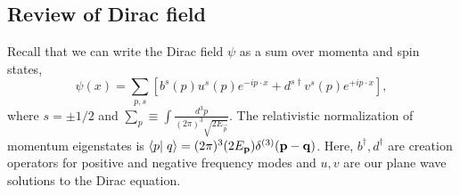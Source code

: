 \subsection*{Review of Dirac field} Recall that we can write the Dirac field $\psi$ as a sum over momenta and spin states,
\begin{equation}
    \psi(x)=\sum_{p,s}\left[ b^s(p) u^s(p) e^{-ip\cdot x}+d^{s\dagger}v^s(p) e^{+ip\cdot x}\right],
\end{equation}
where $s=\pm 1/2$ and $\sum_p\equiv \int \frac{d^3p}{(2\pi)^3 \sqrt{2E_{\vec p}}}$. The relativistic normalization of momentum eigenstates is $\braket{p}{q}=(2\pi)^3 (2E_{\vec p})\delta^{(3)}(\vec p - \vec q)$. Here, $b^\dagger,d^\dagger$ are creation operators for positive and negative frequency modes and $u,v$ are our plane wave solutions to the Dirac equation.